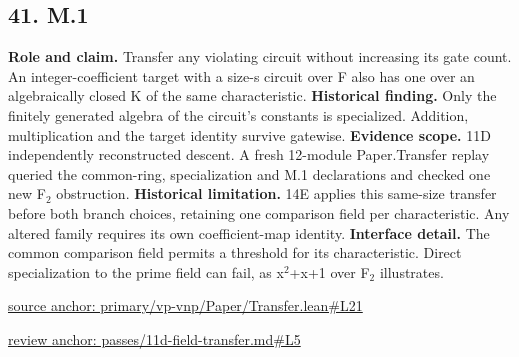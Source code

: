 \documentclass[11pt,letterpaper]{article}
\theoremstyle{definition}\newtheorem{definition}[theorem]{Definition}\newtheorem{example}[theorem]{Example}
\theoremstyle{remark}\newtheorem{remark}[theorem]{Remark}
\begin{document}
\subsection*{41. M.1}
\textbf{Role and claim.} Transfer any violating circuit without increasing its gate count. An integer-coefficient target with a size-s circuit over F also has one over an algebraically closed K of the same characteristic.
\textbf{Historical finding.} Only the finitely generated algebra of the circuit's constants is specialized. Addition, multiplication and the target identity survive gatewise.
\textbf{Evidence scope.} 11D independently reconstructed descent. A fresh 12-module Paper.Transfer replay queried the common-ring, specialization and M.1 declarations and checked one new F\ensuremath{{}_2} obstruction.
\textbf{Historical limitation.} 14E applies this same-size transfer before both branch choices, retaining one comparison field per characteristic. Any altered family requires its own coefficient-map identity.
\textbf{Interface detail.} The common comparison field permits a threshold for its characteristic. Direct specialization to the prime field can fail, as x\ensuremath{{}^2}+x+1 over F\ensuremath{{}_2} illustrates.
\par\href{https://github.com/nousentllc/VP-VNP-Review/blob/8a7976933b6b2b4ffda1ad3a0dfb5fc6b6f023e8/primary/vp-vnp/Paper/Transfer.lean\#L21}{source anchor: primary/vp-vnp/Paper/Transfer.lean\#L21}
\par\href{https://github.com/nousentllc/VP-VNP-Review/blob/8a7976933b6b2b4ffda1ad3a0dfb5fc6b6f023e8/passes/11d-field-transfer.md\#L5}{review anchor: passes/11d-field-transfer.md\#L5}
\goodbreak
{}
\hypertarget{claim.42}{}
\end{document}
